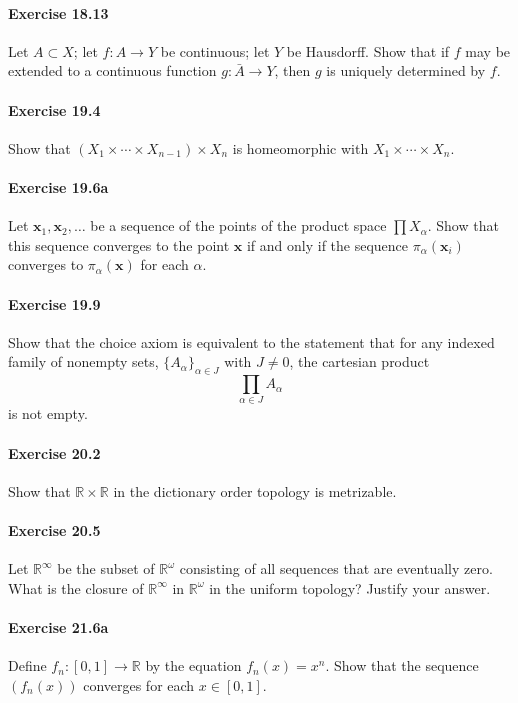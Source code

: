 \documentclass{article}
\begin{document}
\paragraph{Exercise 18.13} Let $A \subset X$; let $f: A \rightarrow Y$ be continuous; let $Y$ be Hausdorff. Show that if $f$ may be extended to a continuous function $g: \bar{A} \rightarrow Y$, then $g$ is uniquely determined by $f$.

\paragraph{Exercise 19.4} Show that $(X_1 \times  \cdots \times X_{n-1}) \times X_n$ is homeomorphic with $X_1 \times  \cdots \times X_n$.

\paragraph{Exercise 19.6a} Let $\mathbf{x}_1, \mathbf{x}_2, \ldots$ be a sequence of the points of the product space $\prod X_\alpha$.  Show that this sequence converges to the point $\mathbf{x}$ if and only if the sequence $\pi_\alpha(\mathbf{x}_i)$ converges to $\pi_\alpha(\mathbf{x})$ for each $\alpha$.

\paragraph{Exercise 19.9} Show that the choice axiom is equivalent to the statement that for any indexed family of nonempty sets, $\{A_\alpha\}_{\alpha \in J}$ with $J \neq 0$, the cartesian product \[\prod_{\alpha \in J} A_\alpha\] is not empty.

\paragraph{Exercise 20.2} Show that $\mathbb{R} \times \mathbb{R}$ in the dictionary order topology is metrizable.

\paragraph{Exercise 20.5} Let $\mathbb{R}^\infty$ be the subset of $\mathbb{R}^\omega$ consisting of all sequences that are eventually zero.  What is the closure of $\mathbb{R}^\infty$ in $\mathbb{R}^\omega$ in the uniform topology? Justify your answer.

\paragraph{Exercise 21.6a} Define $f_{n}:[0,1] \rightarrow \mathbb{R}$ by the equation $f_{n}(x)=x^{n}$. Show that the sequence $\left(f_{n}(x)\right)$ converges for each $x \in[0,1]$.
\end{document}
